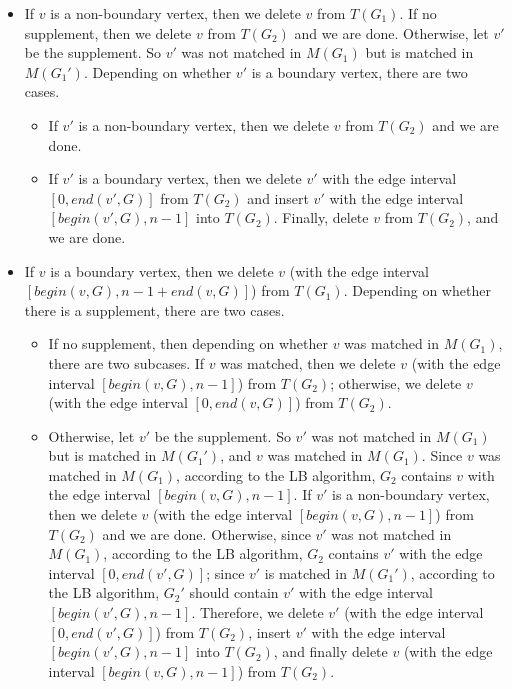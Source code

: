 \documentclass[11pt]{article}
\begin{document}
\begin{itemize}
\item If $v$ is a non-boundary vertex, then we delete $v$ from
$T(G_1)$. If no supplement, then we delete $v$ from $T(G_2)$ and we
are done. Otherwise, let $v'$ be the supplement. So $v'$ was not
matched in $M(G_1)$ but is matched in $M(G_1')$.
Depending on whether $v'$ is a boundary vertex, there are two cases.

\begin{itemize}
\item If $v'$ is a non-boundary vertex, then we delete $v$ from
$T(G_2)$ and we are done.

\item If $v'$ is a boundary vertex, then we delete $v'$ with the edge interval
$[0,end(v',G)]$ from $T(G_2)$ and insert $v'$ with the edge interval
$[begin(v',G),n-1]$ into
$T(G_2)$. Finally, delete $v$ from $T(G_2)$, and we are done.

\end{itemize}

\item If $v$ is a boundary vertex, then we delete $v$ (with the edge interval
$[begin(v,G),n-1+end(v,G)]$) from $T(G_1)$. Depending on whether there is
a supplement, there are two cases.

\begin{itemize}
\item
If no supplement, then depending on whether $v$ was matched in
$M(G_1)$, there are two subcases. If $v$ was matched, then we
delete $v$ (with the edge interval $[begin(v,G),n-1]$) from $T(G_2)$;
otherwise, we delete $v$ (with the edge interval $[0,end(v,G)]$) from $T(G_2)$.


\item Otherwise, let $v'$ be the supplement.
So $v'$ was not matched in $M(G_1)$ but is matched in $M(G_1')$, and
$v$ was matched in $M(G_1)$.
Since $v$ was matched in $M(G_1)$, according to the LB algorithm,
$G_2$ contains $v$ with the edge interval $[begin(v,G),n-1]$.
If $v'$ is a non-boundary vertex, then we delete $v$ (with the edge interval
$[begin(v,G),n-1]$) from $T(G_2)$ and we are done.
Otherwise, since $v'$ was not matched in $M(G_1)$, according to the LB
algorithm, $G_2$ contains $v'$ with the edge interval $[0,end(v',G)]$;
since $v'$ is matched in $M(G_1')$, according to the LB
algorithm, $G_2'$ should contain $v'$ with the edge interval
$[begin(v',G),n-1]$. Therefore,
we delete $v'$ (with the edge interval $[0,end(v',G)]$) from $T(G_2)$,
insert $v'$ with the edge interval $[begin(v',G),n-1]$ into $T(G_2)$, and finally
delete $v$ (with the edge interval $[begin(v,G),n-1]$) from $T(G_2)$.
\end{itemize}
\end{itemize}
\end{document}
